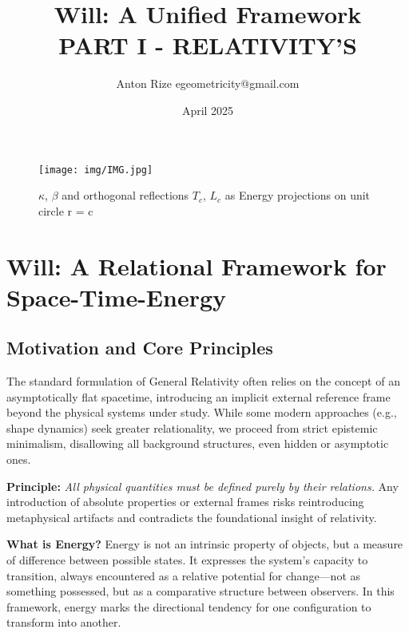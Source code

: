 \documentclass{article}
\title{Will: A Unified Framework\\
PART I - RELATIVITY'S}
\author{Anton Rize egeometricity@gmail.com}
\date{April 2025}
\begin{document}
\theoremstyle{definition}
\newtheorem{definition}{Definition}
\newtheorem{theorem}{Theorem}
\newtheorem{lemma}{Lemma}
\newtheorem{corollary}{Corollary}

\maketitle

\begin{figure}[!htb]
    \centering
    \texttt{[image: img/IMG.jpg]}
    \caption{$\kappa$, $\beta$  and orthogonal reflections $T_c$, $L_c$ as Energy projections on unit circle r = c }
\end{figure}

\newpage

\tableofcontents

\section{Will: A Relational Framework for Space-Time-Energy}

\subsection{Motivation and Core Principles}

The standard formulation of General Relativity often relies on the concept of an asymptotically flat spacetime, introducing an implicit external reference frame beyond the physical systems under study. While some modern approaches (e.g., shape dynamics) seek greater relationality, we proceed from strict epistemic minimalism, disallowing all background structures, even hidden or asymptotic ones.

\textbf{Principle:} \emph{All physical quantities must be defined purely by their relations.} Any introduction of absolute properties or external frames risks reintroducing metaphysical artifacts and contradicts the foundational insight of relativity.

\vspace{1em}
\textbf{What is Energy?} Energy is not an intrinsic property of objects, but a measure of difference between possible states. It expresses the system's capacity to transition, always encountered as a relative potential for change—not as something possessed, but as a comparative structure between observers. In this framework, energy marks the directional tendency for one configuration to transform into another.
\end{document}
